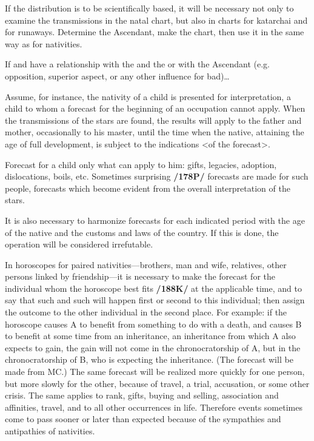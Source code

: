If the distribution is to be scientifically based, it will be necessary not only to examine the transmissions in the natal chart, but also in charts for katarchai and for runaways. 
Determine the Ascendant, make the chart, then use it in the same way as for nativities.

If \Saturn\xspace and \Mars\xspace have a relationship with the \Sun\xspace and the \Moon\xspace or with the Ascendant (e.g.
opposition, superior aspect, or any other influence for bad)\ldots

Assume, for instance, \mndl the nativity of a child is presented for interpretation, a child to whom a forecast for the beginning of an occupation cannot apply. When the transmissions of the stars are found, the results will apply to the father and mother, occasionally to his master, until the time when the native, attaining the age of full development, is subject to the indications <of the forecast>. 

Forecast for a child only what can apply to him: gifts, legacies, adoption, dislocations, boils, etc. Sometimes surprising \textbf{/178P/} forecasts are made for such people, forecasts which become evident from the overall interpretation of the stars. 

It is also necessary to harmonize forecasts for each indicated period with the age of the native and the customs and laws of the country. If this is done, the operation will be considered irrefutable. 

In horoscopes for paired nativities—brothers, man and wife, relatives, other persons linked by friendship—it is necessary to make the forecast for the individual whom the horoscope best fits \textbf{/188K/} at the applicable time, and to say that such and such will happen first or second to this individual; then assign the outcome to the other individual in the second place. For example: if the horoscope causes A to benefit from something to do with a death, and causes B to benefit at some time from an inheritance, an inheritance from which A also expects to gain, the gain will not come in the chronocratorship of A, but in the chronocratorship of B, who is expecting the inheritance. (The forecast will be made from MC.) The
same forecast will be realized more quickly for one person, but more slowly for the other, because of travel, a trial, accusation, or some other crisis. The same applies to rank, gifts, buying and selling, association and affinities, travel, and to all other occurrences in life. Therefore events sometimes come to pass sooner or later than expected because of the sympathies and antipathies of nativities. 

